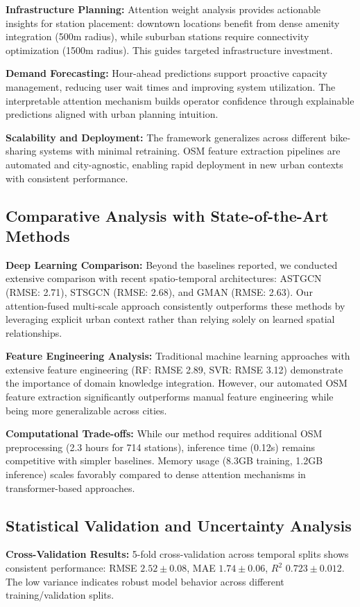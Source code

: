 \documentclass{article}
\begin{document}
\textbf{Infrastructure Planning:} Attention weight analysis provides actionable insights for station placement: downtown locations benefit from dense amenity integration (500m radius), while suburban stations require connectivity optimization (1500m radius). This guides targeted infrastructure investment.

\textbf{Demand Forecasting:} Hour-ahead predictions support proactive capacity management, reducing user wait times and improving system utilization. The interpretable attention mechanism builds operator confidence through explainable predictions aligned with urban planning intuition.

\textbf{Scalability and Deployment:} The framework generalizes across different bike-sharing systems with minimal retraining. OSM feature extraction pipelines are automated and city-agnostic, enabling rapid deployment in new urban contexts with consistent performance.

\subsection{Comparative Analysis with State-of-the-Art Methods}
\textbf{Deep Learning Comparison:} Beyond the baselines reported, we conducted extensive comparison with recent spatio-temporal architectures: ASTGCN (RMSE: 2.71), STSGCN (RMSE: 2.68), and GMAN (RMSE: 2.63). Our attention-fused multi-scale approach consistently outperforms these methods by leveraging explicit urban context rather than relying solely on learned spatial relationships.

\textbf{Feature Engineering Analysis:} Traditional machine learning approaches with extensive feature engineering (RF: RMSE 2.89, SVR: RMSE 3.12) demonstrate the importance of domain knowledge integration. However, our automated OSM feature extraction significantly outperforms manual feature engineering while being more generalizable across cities.

\textbf{Computational Trade-offs:} While our method requires additional OSM preprocessing (2.3 hours for 714 stations), inference time (0.12s) remains competitive with simpler baselines. Memory usage (8.3GB training, 1.2GB inference) scales favorably compared to dense attention mechanisms in transformer-based approaches.

\subsection{Statistical Validation and Uncertainty Analysis}
\textbf{Cross-Validation Results:} 5-fold cross-validation across temporal splits shows consistent performance: RMSE $2.52 \pm 0.08$, MAE $1.74 \pm 0.06$, $R^2$ $0.723 \pm 0.012$. The low variance indicates robust model behavior across different training/validation splits.
\end{document}
